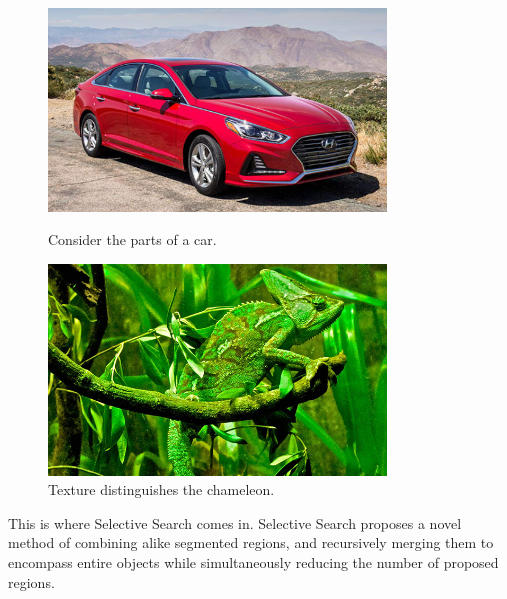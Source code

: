\documentclass{article}
\begin{document}
\begin{figure}[htbp]
    \centering
    \begin{minipage}{0.45\textwidth}
        \centering
        \includegraphics[width=0.8\textwidth]{car.jpg} %
        \caption{Consider the parts of a car.}
    \end{minipage}\hfill
    \begin{minipage}{0.45\textwidth}
        \centering
        \includegraphics[width=0.8\textwidth]{texture.jpg} %
        \caption{Texture distinguishes the chameleon.}
    \end{minipage}
\end{figure}

This is where Selective Search comes in. Selective Search proposes a novel method of combining alike segmented regions, and recursively merging them to encompass entire objects while simultaneously reducing the number of proposed regions.
\end{document}
